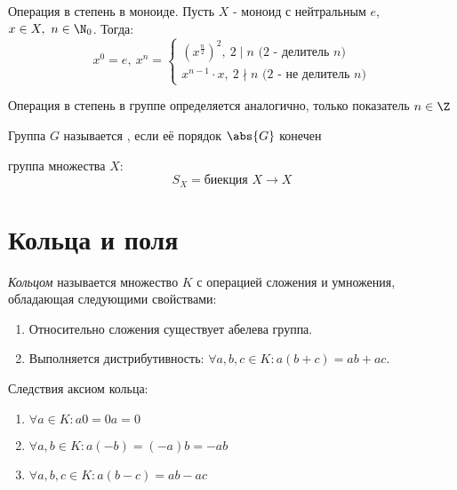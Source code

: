 \documentclass[a4paper, 14pt]{article}
\begin{document}
    \begin{definition}
        Операция { в степень в моноиде.} Пусть $X$ - моноид с нейтральным $e$, $x \in X, \ n \in \N_0$. Тогда:
        \[x^0 = e, \ x^n = 
        \begin{cases}
            \left(x^{\frac{n}{2}}\right)^2, \ 2 \mid n \text{ ($2$ - делитель $n$)}\\
            x^{n-1} \cdot x, \ 2 \nmid n \text{ ($2$ -  не делитель $n$)}
        \end{cases}\]
    \end{definition}
    
    \begin{definition}
        Операция { в степень в группе} определяется аналогично, только показатель $n \in \Z$
    \end{definition}
    
    \begin{definition}
        Группа $G$ называется {}, если её порядок $\abs{G}$ конечен
    \end{definition}
    
    \begin{definition}
        { группа} множества $X$: \[S_X = \text{биекция }X \rightarrow X \]
    \end{definition}
    
    \section{Кольца и поля}

    \begin{definition}
        {\it Кольцом} называется множество $K$ с операцией сложения и умножения, обладающая
        следующими свойствами:
        \begin{enumerate}
            \item Относительно сложения существует абелева группа.
            \item Выполняется дистрибутивность: $\forall a, b, c \in K : a(b + c) = ab + ac$.
        \end{enumerate}
    \end{definition}

    Следствия аксиом кольца:
    \begin{enumerate}
        \item $\forall a \in K : a0 = 0a = 0$
        \item $\forall a, b \in K : a(-b) = (-a)b = -ab$
        \item $\forall a, b, c \in K : a(b-c) = ab - ac$
    \end{enumerate}
\end{document}
